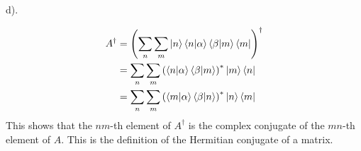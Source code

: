 \documentclass[a4paper,12pt]{article}
\begin{document}
$\phantom{\text{4.}}$
\begin{minipage}[t]{0.9\textwidth}
  d).
  \begin{minipage}[t]{\textwidth}
    \begin{align*}
      A^\dagger &= \left(\sum_n\sum_m\ket{n}\braket{n|\alpha}\braket{\beta|m}\bra{m}\right)^\dagger\\
                &= \sum_n\sum_m \left(\braket{n|\alpha}\braket{\beta|m}\right)^*\ket{m}\bra{n}\\
                &= \sum_n\sum_m \left(\braket{m|\alpha}\braket{\beta|n}\right)^*\ket{n}\bra{m}\\
    \end{align*}
    This shows that the $nm$-th element of $A^\dagger$ is the complex conjugate of the $mn$-th element of $A$. This is the definition of the Hermitian conjugate of a matrix.
  \end{minipage}
\end{minipage}
\end{document}
